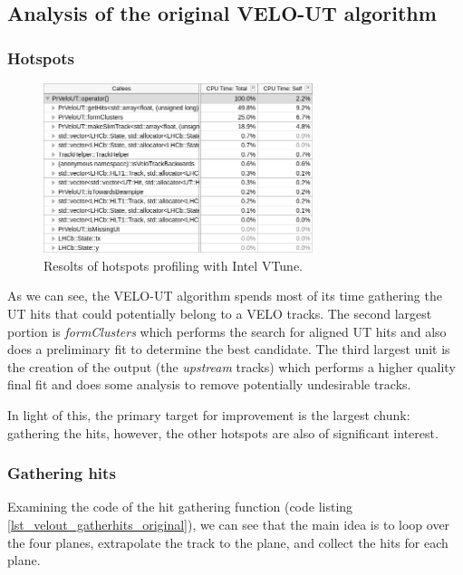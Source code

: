 \documentclass[12pt]{article}
\begin{document}
\subsection{Analysis of the original VELO-UT algorithm}

\subsubsection{Hotspots}

\begin{figure}[H]
	\begin{center}
		\includegraphics[width=0.7\textwidth]{velout_hotspots_orig}
	\end{center}
	\caption{Resolts of hotspots profiling with Intel VTune.}
	\label{fig_velout_hotspots_orig}
\end{figure}

As we can see, the VELO-UT algorithm spends most of its time gathering the UT hits that could potentially belong to a VELO tracks. The second largest portion is \textit{formClusters} which performs the search for aligned UT hits and also does a preliminary fit to determine the best candidate. The third largest unit is the creation of the output (the \textit{upstream} tracks) which performs a higher quality final fit and does some analysis to remove potentially undesirable tracks.

In light of this, the primary target for improvement is the largest chunk: gathering the hits, however, the other hotspots are also of significant interest.


\subsubsection{Gathering hits}

Examining the code of the hit gathering function (code listing \ref{lst_velout_gatherhits_original}), we can see that the main idea is to loop over the four planes, extrapolate the track to the plane, and collect the hits for each plane.
\end{document}
